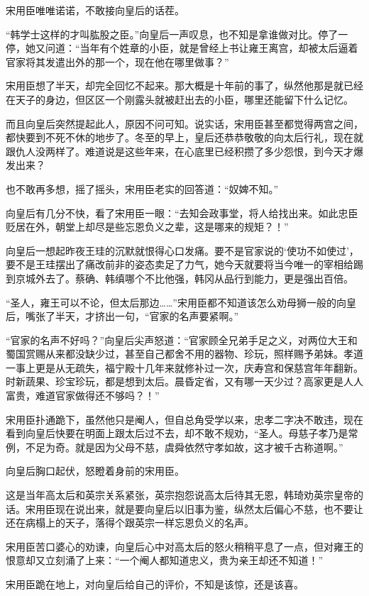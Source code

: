宋用臣唯唯诺诺，不敢接向皇后的话茬。 

“韩学士这样的才叫肱股之臣。”向皇后一声叹息，也不知是拿谁做对比。停了一停，她又问道：“当年有个姓章的小臣，就是曾经上书让雍王离宫，却被太后逼着官家将其发遣出外的那一个，现在他在哪里做事？” 

宋用臣想了半天，却完全回忆不起来。那大概是十年前的事了，纵然他那是就已经在天子的身边，但区区一个刚露头就被赶出去的小臣，哪里还能留下什么记忆。 

而且向皇后突然提起此人，原因不问可知。说实话，宋用臣甚至都觉得两宫之间，都快要到不死不休的地步了。冬至的早上，皇后还恭恭敬敬的向太后行礼，现在就跟仇人没两样了。难道说是这些年来，在心底里已经积攒了多少怨恨，到今天才爆发出来？ 

也不敢再多想，摇了摇头，宋用臣老实的回答道：“奴婢不知。” 

向皇后有几分不快，看了宋用臣一眼：“去知会政事堂，将人给找出来。如此忠臣贬居在外，朝堂上却尽是些忘恩负义之辈，这是哪来的规矩？！” 

向皇后一想起昨夜王珪的沉默就恨得心口发痛。要不是官家说的‘使功不如使过’，要不是王珪摆出了痛改前非的姿态卖足了力气，她今天就要将当今唯一的宰相给踢到京城外去了。蔡确、韩缜哪个不比他强，韩冈从品行到能力，更是强出百倍。 

“圣人，雍王可以不论，但太后那边……”宋用臣都不知道该怎么劝母狮一般的向皇后，嘴张了半天，才挤出一句，“官家的名声要紧啊。” 

“官家的名声不好吗？”向皇后尖声怒道：“官家顾全兄弟手足之义，对两位大王和蜀国赏赐从来都没缺少过，甚至自己都舍不用的器物、珍玩，照样赐予弟妹。孝道一事上更是从无疏失，福宁殿十几年来就修补过一次，庆寿宫和保慈宫年年翻新。时新蔬果、珍宝珍玩，都是想到太后。晨昏定省，又有哪一天少过？高家更是人人富贵，难道官家做得还不够吗？！” 

宋用臣扑通跪下，虽然他只是阉人，但自总角受学以来，忠孝二字决不敢违，现在看到向皇后快要在明面上跟太后过不去，却不敢不规劝，“圣人。母慈子孝乃是常例，不足为奇。就是因为父母不慈，虞舜依然守孝如故，这才被千古称道啊。” 

向皇后胸口起伏，怒瞪着身前的宋用臣。 

这是当年高太后和英宗关系紧张，英宗抱怨说高太后待其无恩，韩琦劝英宗皇帝的话。宋用臣现在说出来，就是要向皇后以旧事为鉴，纵然太后偏心不慈，也不要让还在病榻上的天子，落得个跟英宗一样忘恩负义的名声。 

宋用臣苦口婆心的劝谏，向皇后心中对高太后的怒火稍稍平息了一点，但对雍王的恨意却又立刻涌了上来：“一个阉人都知道忠义，贵为亲王却还不知道！” 

宋用臣跪在地上，对向皇后给自己的评价，不知是该惊，还是该喜。 


